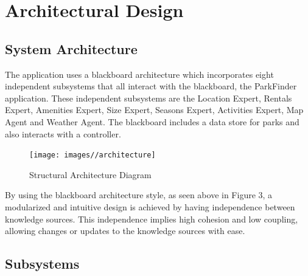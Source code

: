 \documentclass[titlepage,12pt]{article}
\begin{document}
\section{Architectural Design}
\label{sec:architectural_design}


\subsection{System Architecture}
\label{sub:system_architecture}

The application uses a blackboard architecture which incorporates eight independent subsystems that all interact with the blackboard, the ParkFinder application. These independent subsystems are the Location Expert, Rentals Expert, Amenities Expert, Size Expert, Seasons Expert, Activities Expert, Map Agent and Weather Agent. The blackboard includes a data store for parks and also interacts with a controller.\newline 

\begin{figure}[H]
	\centerline{\texttt{[image: images//architecture]}}
	\caption{Structural Architecture Diagram}
	\label{useCaseDiagram}
\end{figure} 

By using the blackboard architecture style, as seen above in Figure 3, a modularized and intuitive design is achieved by having independence between knowledge sources. This independence implies high cohesion and low coupling, allowing changes or updates to the knowledge sources with ease. 



\subsection{Subsystems}
\label{sub:subsystems}
\end{document}
